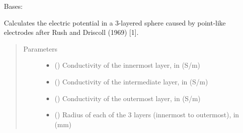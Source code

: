 \documentclass[letterpaper,10pt,english,openany,oneside]{sphinxmanual}
\begin{document}

\begin{fulllineitems}
\label{\detokenize{pygpc.testfunctions:pygpc.testfunctions.testfunctions.SphereModel}}
Bases: {\hyperref[\detokenize{pygpc:pygpc.AbstractModel.AbstractModel}]{}}

Calculates the electric potential in a 3-layered sphere caused by point-like electrodes
after Rush and Driscoll (1969) {[}1{]}.
\begin{quote}\begin{description}
\item[{Parameters}] \leavevmode\begin{itemize}
\item {} 
\sphinxstyleliteralstrong{\sphinxupquote{{[}}}\sphinxstyleliteralstrong{\sphinxupquote{{]}}} () \textendash{} Conductivity of the innermost layer, in (S/m)

\item {} 
\sphinxstyleliteralstrong{\sphinxupquote{{[}}}\sphinxstyleliteralstrong{\sphinxupquote{{]}}} () \textendash{} Conductivity of the intermediate layer, in (S/m)

\item {} 
\sphinxstyleliteralstrong{\sphinxupquote{{[}}}\sphinxstyleliteralstrong{\sphinxupquote{{]}}} () \textendash{} Conductivity of the outermost layer, in (S/m)

\item {} 
\sphinxstyleliteralstrong{\sphinxupquote{{[}}}\sphinxstyleliteralstrong{\sphinxupquote{{]}}} (\sphinxstyleliteralemphasis{\sphinxupquote{ {[}}}\sphinxstyleliteralemphasis{\sphinxupquote{{]}}}) \textendash{} Radius of each of the 3 layers (innermost to outermost), in (mm)


\end{itemize}
\end{description}
\end{quote}
\end{fulllineitems}
\end{document}
